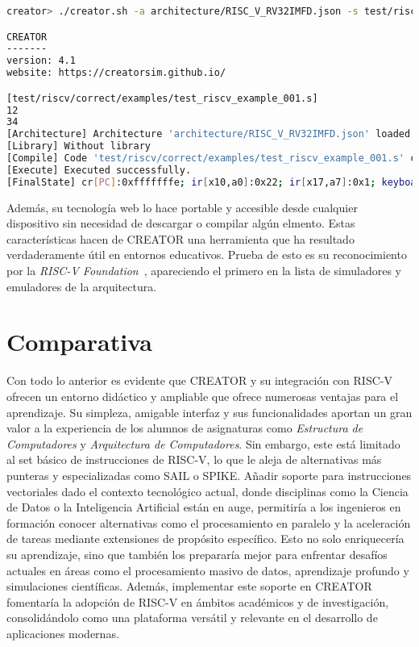 \vfill
\vspace{0.5cm}
\begin{lstlisting}[caption=Interfaz por línea de comandos de CREATORa, label={lst:creator-cli}, language=bash]
creator> ./creator.sh -a architecture/RISC_V_RV32IMFD.json -s test/riscv/correct/examples/test_riscv_example_001.s

CREATOR
-------
version: 4.1
website: https://creatorsim.github.io/

[test/riscv/correct/examples/test_riscv_example_001.s]
12
34
[Architecture] Architecture 'architecture/RISC_V_RV32IMFD.json' loaded successfully.
[Library] Without library
[Compile] Code 'test/riscv/correct/examples/test_riscv_example_001.s' compiled successfully.
[Execute] Executed successfully.
[FinalState] cr[PC]:0xfffffffe; ir[x10,a0]:0x22; ir[x17,a7]:0x1; keyboard[0x0]:''; display[0x0]:'1234';
\end{lstlisting}

Además, su tecnología web lo hace portable y accesible desde cualquier
dispositivo sin necesidad de descargar o compilar algún elmento. Estas
características hacen de CREATOR una herramienta que ha resultado
verdaderamente útil en entornos educativos. Prueba de esto es su reconocimiento
por la \textit{RISC-V Foundation}~\cite{creator-riscvFoundation}, apareciendo
el primero en la lista de simuladores y emuladores de la arquitectura.


\section{Comparativa}

Con todo lo anterior es evidente que CREATOR y su integración con RISC-V
ofrecen un entorno didáctico y ampliable que ofrece numerosas ventajas para el
aprendizaje. Su simpleza, amigable interfaz y sus funcionalidades aportan un
gran valor a la experiencia de los alumnos de asignaturas como
\textit{Estructura de Computadores} y \textit{Arquitectura de Computadores}.
Sin embargo, este está limitado al set básico de instrucciones de RISC-V, lo
que le aleja de alternativas más punteras y especializadas como SAIL o SPIKE\@.
Añadir soporte para instrucciones vectoriales dado el contexto tecnológico
actual, donde disciplinas como la Ciencia de Datos o la Inteligencia Artificial
están en auge, permitiría a los ingenieros en formación conocer alternativas
como el procesamiento en paralelo y la aceleración de tareas mediante
extensiones de propósito específico. Esto no solo enriquecería su aprendizaje,
sino que también los prepararía mejor para enfrentar desafíos actuales en áreas
como el procesamiento masivo de datos, aprendizaje profundo y simulaciones
científicas. Además, implementar este soporte en CREATOR fomentaría la adopción
de RISC-V en ámbitos académicos y de investigación, consolidándolo como una
plataforma versátil y relevante en el desarrollo de aplicaciones modernas.

